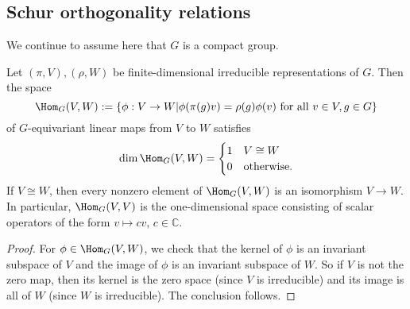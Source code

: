 \documentclass[reqno]{amsart} 
\begin{document}

\subsection{Schur orthogonality relations}
\label{sec:orga60f514}
We continue to assume here
that $G$ is a compact group.
\begin{lemma}\label{lem:schur-lemma-for-morphisms}
  Let $(\pi,V), (\rho,W)$ be finite-dimensional irreducible
  representations of $G$.
  Then the space
  \begin{equation*}
  \Hom_G(V,W)
  :=
  \{\phi : V \rightarrow W \lvert \phi(\pi(g) v) = \rho(g) \phi(v) \text{ for all } v \in V, g \in G \}
  \end{equation*}
  of $G$-equivariant linear maps
  from $V$ to $W$ satisfies
  \begin{equation*}
  \dim \Hom_G(V,W)
  = 
\begin{cases}
    1 & V \cong W \\
    0 & \text{otherwise.}
  \end{cases}
  \end{equation*}
  If $V \cong W$,
  then every nonzero element
  of $\Hom_G(V,W)$ is an isomorphism $V \rightarrow W$.
  In particular, $\Hom_G(V,V)$ is the one-dimensional space
  consisting of scalar operators of the form $v \mapsto c v$,
  $c \in \mathbb{C}$.
\end{lemma}
\begin{proof}
  For $\phi \in \Hom_G(V,W)$,
  we check that the kernel of $\phi$ is an invariant subspace
  of $V$ and the image of $\phi$ is an invariant subspace of
  $W$.
  So if $V$ is not the zero map, then its kernel is the zero
  space (since $V$ is irreducible)
  and its image is all of $W$ (since $W$ is irreducible).
  The conclusion follows.
\end{proof}
\end{document}
